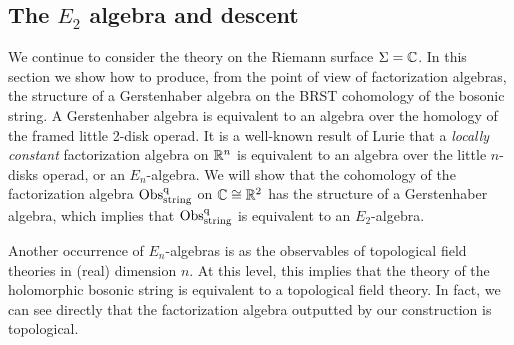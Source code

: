 \subsection{The $E_2$ algebra and descent}

We continue to consider the theory on the Riemann surface $\Sigma = \mathbb C$. 
In this section we show how to produce, from the point of view of factorization algebras, the structure of a Gerstenhaber algebra on the BRST cohomology of the bosonic string. 
A Gerstenhaber algebra is equivalent to an algebra over the homology of the framed little 2-disk operad. 
It is a well-known result of Lurie \cite{Lurie} that a {\em locally constant} factorization algebra on $\mathbb R^n$ is equivalent to an algebra over the little $n$-disks operad, or an $E_n$-algebra. 
We will show that the cohomology of the factorization algebra ${\rm Obs}^{{\rm q}}_{\rm string}$ on $\mathbb C \cong \mathbb R^2$ has the structure of a Gerstenhaber algebra, which implies that ${\rm Obs}^{\rm q}_{\rm string}$ is equivalent to an $E_2$-algebra. 

Another occurrence of $E_n$-algebras is as the observables of topological field theories in (real) dimension $n$. 
At this level, this implies that the theory of the holomorphic bosonic string is equivalent to a topological field theory. 
In fact, we can see directly that the factorization algebra outputted by our construction is topological. 

